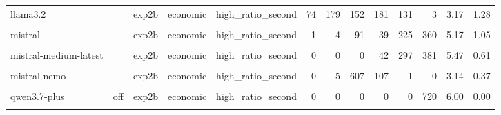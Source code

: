 \documentclass[
]{article}
\begin{document}
\begin{table}[!h]
{\begin{tabular}[t]{lllllrrrrrrrr}
llama3.2 &  & exp2b & economic & high\_ratio\_second & 74 & 179 & 152 & 181 & 131 & 3 & 3.17 & 1.28\\
\cellcolor{gray!10}{mistral} & \cellcolor{gray!10}{} & \cellcolor{gray!10}{exp2b} & \cellcolor{gray!10}{economic} & \cellcolor{gray!10}{high\_ratio\_first} & \cellcolor{gray!10}{39} & \cellcolor{gray!10}{158} & \cellcolor{gray!10}{200} & \cellcolor{gray!10}{192} & \cellcolor{gray!10}{36} & \cellcolor{gray!10}{95} & \cellcolor{gray!10}{3.43} & \cellcolor{gray!10}{1.38}\\
mistral &  & exp2b & economic & high\_ratio\_second & 1 & 4 & 91 & 39 & 225 & 360 & 5.17 & 1.05\\
\addlinespace
\cellcolor{gray!10}{mistral-medium-latest} & \cellcolor{gray!10}{} & \cellcolor{gray!10}{exp2b} & \cellcolor{gray!10}{economic} & \cellcolor{gray!10}{high\_ratio\_first} & \cellcolor{gray!10}{0} & \cellcolor{gray!10}{20} & \cellcolor{gray!10}{446} & \cellcolor{gray!10}{36} & \cellcolor{gray!10}{187} & \cellcolor{gray!10}{31} & \cellcolor{gray!10}{3.67} & \cellcolor{gray!10}{1.03}\\
mistral-medium-latest &  & exp2b & economic & high\_ratio\_second & 0 & 0 & 0 & 42 & 297 & 381 & 5.47 & 0.61\\
\cellcolor{gray!10}{mistral-nemo} & \cellcolor{gray!10}{} & \cellcolor{gray!10}{exp2b} & \cellcolor{gray!10}{economic} & \cellcolor{gray!10}{high\_ratio\_first} & \cellcolor{gray!10}{0} & \cellcolor{gray!10}{0} & \cellcolor{gray!10}{66} & \cellcolor{gray!10}{641} & \cellcolor{gray!10}{13} & \cellcolor{gray!10}{0} & \cellcolor{gray!10}{3.93} & \cellcolor{gray!10}{0.32}\\
mistral-nemo &  & exp2b & economic & high\_ratio\_second & 0 & 5 & 607 & 107 & 1 & 0 & 3.14 & 0.37\\
\cellcolor{gray!10}{qwen3.7-plus} & \cellcolor{gray!10}{off} & \cellcolor{gray!10}{exp2b} & \cellcolor{gray!10}{economic} & \cellcolor{gray!10}{high\_ratio\_first} & \cellcolor{gray!10}{11} & \cellcolor{gray!10}{0} & \cellcolor{gray!10}{0} & \cellcolor{gray!10}{0} & \cellcolor{gray!10}{3} & \cellcolor{gray!10}{706} & \cellcolor{gray!10}{5.92} & \cellcolor{gray!10}{0.62}\\
\addlinespace
qwen3.7-plus & off & exp2b & economic & high\_ratio\_second & 0 & 0 & 0 & 0 & 0 & 720 & 6.00 & 0.00\\
\cellcolor{gray!10}{qwen3.7-plus} & \cellcolor{gray!10}{on} & \cellcolor{gray!10}{exp2b} & \cellcolor{gray!10}{economic} & \cellcolor{gray!10}{high\_ratio\_first} & \cellcolor{gray!10}{0} & \cellcolor{gray!10}{0} & \cellcolor{gray!10}{0} & \cellcolor{gray!10}{0} & \cellcolor{gray!10}{0} & \cellcolor{gray!10}{720} & \cellcolor{gray!10}{6.00} & \cellcolor{gray!10}{0.00}\\

\end{tabular}}
\end{table}
\end{document}

